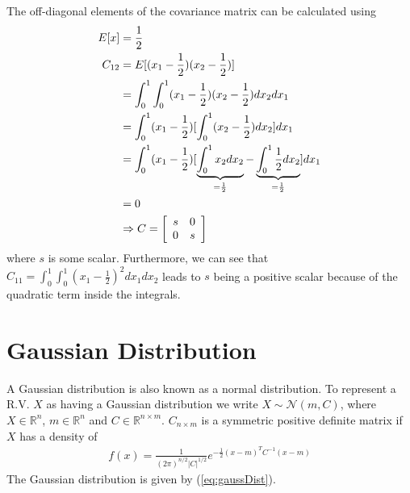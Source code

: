 The off-diagonal elements of the covariance matrix can be calculated using
\begin{align*}
E[x] &= \frac{1}{2} \\
C_{12} &= E[(x_1 - \frac{1}{2})(x_2 - \frac{1}{2})] \\
&= \int_0^1 \int_0^1 (x_1 - \frac{1}{2})(x_2 - \frac{1}{2})dx_2dx_1 \\
&= \int_0^1 (x_1 - \frac{1}{2})[\int_0^1 (x_2 - \frac{1}{2})dx_2]dx_1 \\
&= \int_0^1 (x_1 - \frac{1}{2})[\underbrace{\int_0^1 x_2dx_2}_{= \frac{1}{2}} - \underbrace{\int_0^1 \frac{1}{2}dx_2}_{= \frac{1}{2}}]dx_1 \\
&= 0 \\
&\Rightarrow C = \left[\begin{array}{c c}
                         s & 0 \\ 0 & s
                       \end{array}\right]
\end{align*}
where $s$ is some scalar. Furthermore, we can see that \\
$C_{11} = \int_0^1\int_0^1(x_1-\frac{1}{2})^2dx_1dx_2$ leads to $s$ being a positive scalar because of the quadratic term inside the integrals.

\section{Gaussian Distribution}
A Gaussian distribution is also known as a normal distribution. To represent a R.V. $X$ as having a Gaussian distribution we write $X \sim \mathcal{N}(m,C)$, where $X \in \mathbb{R}^n$, $m \in \mathbb{R}^n$ and $C \in \mathbb{R}^{n \times m}$. $C_{n \times m}$ is a symmetric positive definite matrix if $X$ has a density of
\begin{align}
\label{eq:gaussDist}
f(x) = \frac{1}{(2\pi)^{n/2}|C|^{1/2}}e^{-\frac{1}{2}(x-m)^TC^{-1}(x-m)}
\end{align}
The Gaussian distribution is given by (\ref{eq:gaussDist}).


% 

